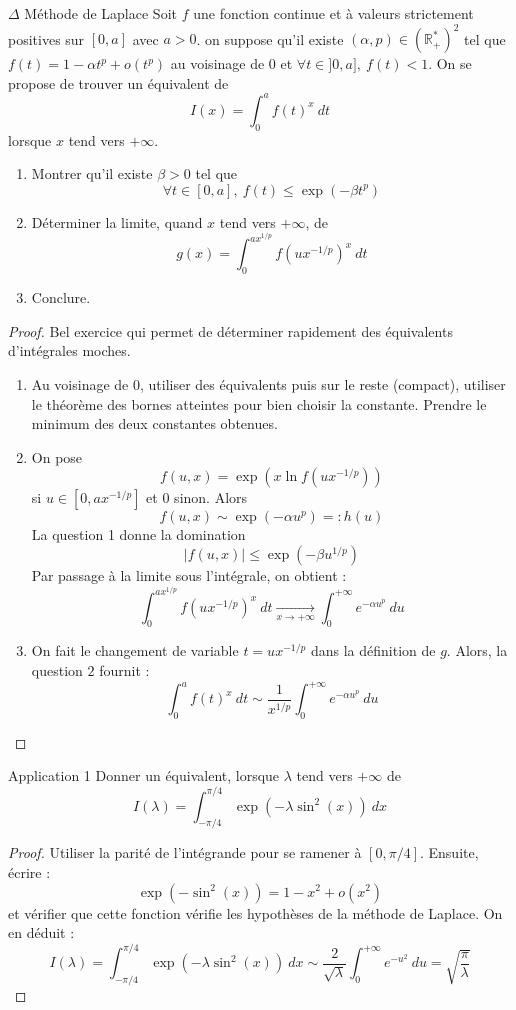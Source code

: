 \documentclass[french,a4paper]{article}
\newcommand{\R}{\mathbb{R}}
\newcommand{\st}{^*}
\theoremstyle{plain}
\theoremstyle{definition}
\theoremstyle{remark}
\begin{document}
\begin{ex}[Moulin.IP.35]{$\Delta$ Méthode de Laplace}
	Soit $f$ une fonction continue et à valeurs strictement positives sur $[0,a]$ avec $a>0$. on suppose qu'il existe $(\alpha,p)\in(\R_+\st)^2$ tel que $f(t)=1-\alpha t^p+o(t^p)$ au voisinage de $0$ et $\forall t\in]0,a],\ f(t)<1$. On se propose de trouver un équivalent de $$I(x)=\int_{0}^{a}f(t)^x\ dt$$ lorsque $x$ tend vers $+\infty$.
	\begin{enumerate}
		\item Montrer qu'il existe $\beta>0$ tel que $$\forall t\in[0,a],\ f(t)\leqslant\exp(-\beta t^p)$$
		\item Déterminer la limite, quand $x$ tend vers $+\infty$, de $$g(x)=\int_{0}^{ax^{1/p}}f\left(ux^{-1/p}\right)^x\ dt$$
		\item Conclure.
	\end{enumerate}
\end{ex}
\begin{proof}
	Bel exercice qui permet de déterminer rapidement des équivalents d'intégrales moches.
	\begin{enumerate}
		\item Au voisinage de $0$, utiliser des équivalents puis sur le reste (compact), utiliser le théorème des bornes atteintes pour bien choisir la constante. Prendre le minimum des deux constantes obtenues.
		\item On pose $$f(u,x)=\exp\left(x\ln f\left(ux^{-1/p}\right)\right)$$ si $u\in[0,ax^{-1/p}]$ et $0$ sinon. Alors $$f(u,x)\sim \exp(-\alpha u^p)=:h(u)$$ La question 1 donne la domination $$\lvert f(u,x)\rvert\leqslant\exp(-\beta u^{1/p})$$ Par passage à la limite sous l'intégrale, on obtient : $$\int_{0}^{ax^{1/p}}f\left(ux^{-1/p}\right)^x\ dt\xrightarrow[x\to+\infty]{}\int_{0}^{+\infty}e^{-\alpha u^p}\ du$$
		\item On fait le changement de variable $t=ux^{-1/p}$ dans la définition de $g$. Alors, la question $2$ fournit : $$\int_{0}^{a}f(t)^x\ dt\sim \frac{1}{x^{1/p}}\int_{0}^{+\infty}e^{-\alpha u^p}\ du$$
	\end{enumerate}
\end{proof}

\begin{ex}[Moulin.IP.36]{Application 1}
	Donner un équivalent, lorsque $\lambda$ tend vers $+\infty$ de $$I(\lambda)=\int_{-\pi/4}^{\pi/4}\exp(-\lambda\sin^2(x))\ dx$$
\end{ex}
\begin{proof}
	Utiliser la parité de l'intégrande pour se ramener à $[0,\pi/4]$. Ensuite, écrire : $$\exp(-\sin^2(x))=1-x^2+o(x^2)$$ et vérifier que cette fonction vérifie les hypothèses de la méthode de Laplace. On en déduit : $$I(\lambda)=\int_{-\pi/4}^{\pi/4}\exp(-\lambda\sin^2(x))\ dx\sim\frac{2}{\sqrt{\lambda}}\int_{0}^{+\infty}e^{-u^2}\ du=\sqrt{\frac{\pi}{\lambda}}$$
\end{proof}
\end{document}
